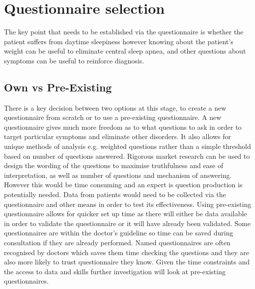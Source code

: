 \section{Questionnaire selection}
\label{sec:questionnaire-sophie}
The key point that needs to be established via the questionnaire is whether the patient suffers from daytime sleepiness however knowing about the patient’s weight can be useful to eliminate central sleep apnea, and other questions about symptoms can be useful to reinforce diagnosis. 

\subsection{Own vs Pre-Existing}
There is a key decision between two options at this stage, to create a new questionnaire from scratch or to use a pre-existing questionnaire. A new questionnaire gives much more freedom as to what questions to ask in order to target particular symptoms and eliminate other disorders. It also allows for unique methods of analysis e.g. weighted questions rather than a simple threshold based on number of questions answered. Rigorous market research can be used to design the wording of the questions to maximise truthfulness and ease of interpretation, as well as number of questions and mechanism of answering. However this would be time consuming and an expert is question production is potentially needed. Data from patients would need to be collected via the questionnaire and other means in order to test its effectiveness. 
Using pre-existing questionnaire allows for quicker set up time as there will either be data available in order to validate the questionnaire or it will have already been validated. Some questionnaires are within the doctor’s guideline so time can be saved during consultation if they are already performed. Named questionnaires are often recognised by doctors which saves them time checking the questions and they are also more likely to trust questionnaire they know. 
Given the time constraints and the access to data and skills further investigation will look at pre-existing questionnaires. 

